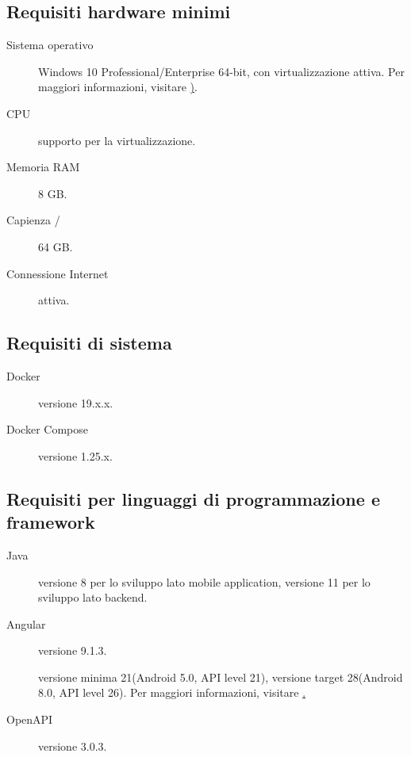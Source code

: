 \documentclass[../../../manuale-manutentore.tex]{subfiles}
\begin{document}
\subsection{Requisiti hardware minimi}%
\label{sub:requisiti_hardware_minimi}

\begin{description}
    \item[Sistema operativo] Windows 10 Professional/Enterprise 64-bit, con virtualizzazione  attiva. Per maggiori informazioni, visitare \href{https://docs.microsoft.com/it-it/virtualization/hyper-v-on-windows/quick-start/enable-hyper-v}).
    \item[CPU] supporto per la virtualizzazione.
    \item[Memoria RAM] 8 GB\@.
    \item[Capienza /] 64 GB\@.
    \item[Connessione Internet] attiva.
\end{description}

\subsection{Requisiti di sistema}%
\label{sub:requisiti_di_sistema}

\begin{description}
    \item[Docker] versione 19.x.x.
    \item[Docker Compose] versione 1.25.x.
\end{description}

\subsection{Requisiti per linguaggi di programmazione e framework}%
\label{sub:requisiti_per_linguaggi_di_programmazione_e_framwework}

\begin{description}
  \item[Java] versione 8 per lo sviluppo lato mobile application, versione 11 per lo sviluppo lato backend.
  \item[Angular] versione 9.1.3.
  \item[] versione minima 21(Android 5.0, API level 21), versione target 28(Android 8.0, API level 26). Per maggiori informazioni, visitare \href{https://developer.android.com/studio/releases/platforms}.
  \item[OpenAPI] versione 3.0.3.
\end{description}
\end{document}
